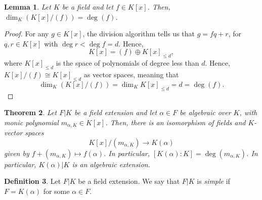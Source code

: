 \documentclass[a4paper, openany]{memoir}
\theoremstyle{definition}
\newtheorem{definition}{Definition}[section]
\theoremstyle{plain}
\newtheorem{theorem}[definition]{Theorem}
\newtheorem{lemma}[definition]{Lemma}
\begin{document}
    \begin{lemma}
        Let $K$ be a field and let $f \in K[x]$. Then, $\dim_K(K[x]/(f)) = \deg (f)$.
    \end{lemma}
    \begin{proof}
        For any $g \in K[x]$, the division algorithm tells us that $g = fq + r$, for $q, r \in K[x]$ with $\deg r < \deg f = d$. Hence, 
        \[K[x] = (f) \oplus K[x]_{\leq d},\]
        where $K[x]_{\leq d}$ is the space of polynomials of degree less than $d$. Hence, $K[x]/(f) \cong K[x]_{\leq d}$ as vector spaces, meaning that 
        \[\dim_K(K[x]/(f)) = \dim_K K[x]_{\leq d} = d = \deg (f).\]
    \end{proof}

    \begin{theorem}
        Let $F|K$ be a field extension and let $\alpha \in F$ be algebraic over $K$, with monic polynomial $m_{\alpha, K} \in K[x]$. Then, there is an isomorphism of fields and $K$-vector spaces
        \[K[x]/(m_{\alpha, K}) \to K(\alpha)\]
        given by $f + (m_{\alpha, K}) \mapsto f(\alpha)$. In particular, $[K(\alpha) : K] = \deg (m_{\alpha, K})$. In particular, $K(\alpha)|K$ is an algebraic extension.
    \end{theorem}

    \begin{definition}
        Let $F|K$ be a field extension. We say that $F|K$ is \emph{simple} if $F = K(\alpha)$ for some $\alpha \in F$.
    \end{definition}
\end{document}
